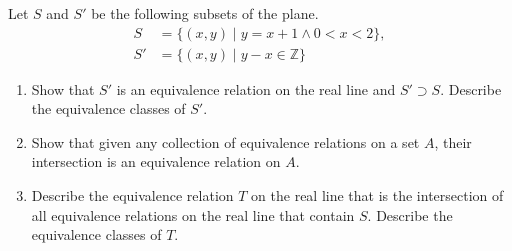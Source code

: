 \begin{exercise}\label{chapter1:section3:exercise5}
    Let $S$ and $S'$ be the following subsets of the plane.
    \begin{align*}
        S  & = \{ (x, y) \mid y = x + 1 \land 0 < x < 2 \}, \\
        S' & = \{ (x, y) \mid y - x \in\mathbb{Z} \}
    \end{align*}

    \begin{enumerate}[label={(\alph*)}]
        \item Show that $S'$ is an equivalence relation on the real line and $S'\supset S$. Describe the equivalence classes of $S'$.
        \item Show that given any collection of equivalence relations on a set $A$, their intersection is an equivalence relation on $A$.
        \item Describe the equivalence relation $T$ on the real line that is the intersection of all equivalence relations on the real line that contain $S$. Describe the equivalence classes of $T$.
    \end{enumerate}
\end{exercise}

